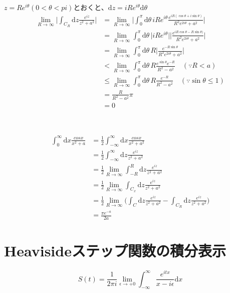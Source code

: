 \documentclass[dvipdfmx,a4paper]{jsarticle}
\begin{document}
 \subsection{}
 $z = Re^{i\theta}(0 < \theta <pi)$とおくと、$\mathrm{d}z = iRe^{i\theta}\mathrm{d}\theta$
 \begin{align*}
 \lim_{R \to {\infty}} \biggl|\int_{C_R}\mathrm{d}z\frac{e^{iz}}{z^2 + a^2}\biggr| &= \lim_{R \to {\infty}} \biggl|\int_{0}^{\pi}\mathrm{d}\theta\, iRe^{i\theta}\frac{e^{iR(\cos{\theta} + i\sin{\theta})}}{R^2e^{2i\theta} + a^2}\biggr|\\
 &= \lim_{R \to {\infty}} \int_{0}^{\pi}\mathrm{d}\theta\, \bigl|iRe^{i\theta}\bigr|\biggl|\frac{e^{iR\cos{\theta} - R\sin{\theta})}}{R^2e^{2i\theta} + a^2}\biggr|\\
 &= \lim_{R \to {\infty}} \int_{0}^{\pi}\mathrm{d}\theta\, R\biggl|\frac{e^{- R\sin{\theta}}}{R^2e^{2i\theta} + a^2}\biggr|\\
 &< \lim_{R \to {\infty}} \int_{0}^{\pi}\mathrm{d}\theta\, R\frac{e^{\sin{\theta}}e^{- R}}{R^2- a^2}\quad(\because R < a)\\
 &\leq\lim_{R \to {\infty}} \int_{0}^{\pi}\mathrm{d}\theta\, R\frac{e^{- R}}{R^2- a^2}\quad(\because \sin{\theta}\leq1)\\
 &= \frac{R}{R^2 - a^2}\pi\\
  &= 0
 \end{align*}
 \\
 
 \subsection{}
 \begin{align*}
 \int_{0}^{\infty}\mathrm{d}x\frac{cos{x}}{x^2 + a} &= \frac{1}{2}\int_{-\infty}^{\infty}\mathrm{d}x\frac{cos{x}}{x^2 + a^2}\\
 &= \frac{1}{2}\int_{-\infty}^{\infty}\mathrm{d}z\frac{e^{iz}}{z^2 + a^2}\\
 &= \frac{1}{2}\lim_{R \to \infty}\int_{-R}^{R}\mathrm{d}z\frac{e^{iz}}{z^2 + a^2}\\
 &= \frac{1}{2}\lim_{R \to \infty}\int_{C_x}\mathrm{d}z\frac{e^{iz}}{z^2 + a^2}\\
 &= \frac{1}{2}\lim_{R \to \infty}\biggl(\int_{C}\mathrm{d}z\frac{e^{iz}}{z^2 + a^2} - \int_{C_R}\mathrm{d}z\frac{e^{iz}}{z^2 + a^2}\biggr)\\
 &= \frac{\pi e^{-a}}{2a}
 \end{align*}
 
 \section{Heavisideステップ関数の積分表示}
 $$
 S(t) = \frac{1}{2\pi i}\lim_{\epsilon \to +0}\int_{-\infty}^{\infty}\frac{e^{itx}}{x - i\epsilon}\mathrm{d}x
 $$
\end{document}
